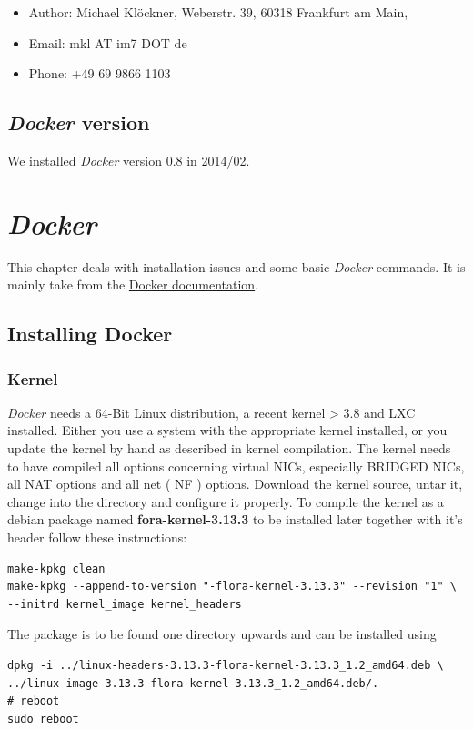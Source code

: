 \documentclass[captions=tableheading]{article}
\begin{document}
\begin{itemize}
\item Author: Michael Klöckner, Weberstr. 39, 60318 Frankfurt am Main,
\item Email: mkl AT im7 DOT de
\item Phone: +49 69 9866 1103
\end{itemize}
\subsection{\emph{Docker} version}
\label{sec-1-4}

   We installed \emph{Docker} version 0.8 in 2014/02.
\section{\emph{Docker}}
\label{sec-2}

This chapter deals with installation issues and some basic \emph{Docker} commands. It is mainly take from the \href{http://docs.docer.io/en/latest/}{Docker documentation}. 
\subsection{Installing Docker}
\label{sec-2-1}
\subsubsection{Kernel}
\label{sec-2-1-1}

\emph{Docker} needs a 64-Bit Linux distribution, a recent kernel > 3.8 and LXC
installed. Either you use a system with the appropriate kernel installed, or
you update the kernel by hand as described in kernel compilation. The kernel needs to have compiled all options concerning virtual NICs, especially
BRIDGED NICs, all NAT options and all net  ( NF ) options. Download
the kernel source, untar it, change into the directory and configure it properly. To compile the kernel as a debian package named \textbf{fora-kernel-3.13.3}
to be installed later together with it's header follow these instructions:

\begin{verbatim}
make-kpkg clean
make-kpkg --append-to-version "-flora-kernel-3.13.3" --revision "1" \
--initrd kernel_image kernel_headers
\end{verbatim}
The package is to be found one directory upwards and can be installed using

\begin{verbatim}
dpkg -i ../linux-headers-3.13.3-flora-kernel-3.13.3_1.2_amd64.deb \
../linux-image-3.13.3-flora-kernel-3.13.3_1.2_amd64.deb/.
# reboot
sudo reboot
\end{verbatim}
\end{document}
